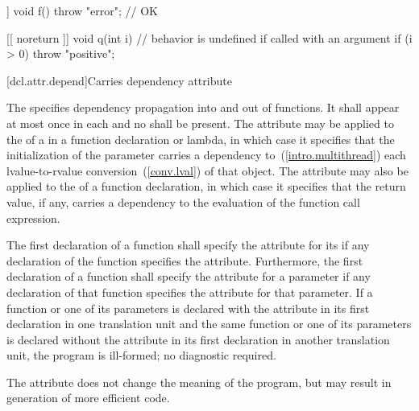 \pnum
\enterexample
\begin{codeblock}
[[ noreturn ]] void f() {
  throw "error";        // OK
}

[[ noreturn ]] void q(int i) { // behavior is undefined if called with an argument 
  if (i > 0)
    throw "positive";
}
\end{codeblock}
\exitexample

[dcl.attr.depend]{Carries dependency attribute}%

\pnum
The   specifies
dependency propagation into and out of functions. It shall appear at most once
in each  and no
 shall be present. The attribute may be
applied to the  of a
 in a function declaration or lambda, in
which case it specifies that the initialization of the parameter carries a
dependency to~(\ref{intro.multithread}) each lvalue-to-rvalue
conversion~(\ref{conv.lval}) of that object. The attribute may also be applied
to the  of a function declaration, in which case it
specifies that the return value, if any, carries a dependency to the evaluation
of the function call expression.

\pnum
The first declaration of a function shall specify the  attribute for its
 if any declaration of the function specifies the
 attribute. Furthermore, the first declaration of a function shall specify
the  attribute for a parameter if any declaration of that function
specifies the  attribute for that parameter. If a function or one of its
parameters is declared with the  attribute in its first declaration in one
translation unit and the same function or one of its parameters is declared without the
 attribute in its first declaration in another translation unit, the
program is ill-formed; no diagnostic required.

\pnum
\enternote The  attribute does not change the meaning of the
program, but may result in generation of more efficient code. \exitnote

